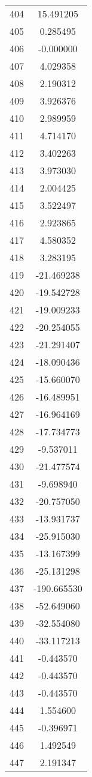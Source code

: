 \documentclass[12pt]{article}
\begin{document}
\begin{longtable}{@{}cc@{}}
404 & 15.491205 \\
405 & 0.285495 \\
406 & -0.000000 \\
407 & 4.029358 \\
408 & 2.190312 \\
409 & 3.926376 \\
410 & 2.989959 \\
411 & 4.714170 \\
412 & 3.402263 \\
413 & 3.973030 \\
414 & 2.004425 \\
415 & 3.522497 \\
416 & 2.923865 \\
417 & 4.580352 \\
418 & 3.283195 \\
419 & -21.469238 \\
420 & -19.542728 \\
421 & -19.009233 \\
422 & -20.254055 \\
423 & -21.291407 \\
424 & -18.090436 \\
425 & -15.660070 \\
426 & -16.489951 \\
427 & -16.964169 \\
428 & -17.734773 \\
429 & -9.537011 \\
430 & -21.477574 \\
431 & -9.698940 \\
432 & -20.757050 \\
433 & -13.931737 \\
434 & -25.915030 \\
435 & -13.167399 \\
436 & -25.131298 \\
437 & -190.665530 \\
438 & -52.649060 \\
439 & -32.554080 \\
440 & -33.117213 \\
441 & -0.443570 \\
442 & -0.443570 \\
443 & -0.443570 \\
444 & 1.554600 \\
445 & -0.396971 \\
446 & 1.492549 \\
447 & 2.191347 \\

\end{longtable}
\end{document}
